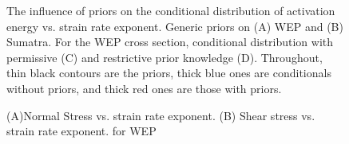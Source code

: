 \documentclass[12pt]{article}
\begin{document}
{\begin{figure}[H]
\caption{The influence of priors on the conditional distribution of activation energy vs. strain rate exponent. Generic priors on (A) WEP 
 and (B) Sumatra. 
For the WEP cross section, conditional distribution with permissive (C) and 
restrictive prior knowledge (D).  
Throughout, thin black contours are the priors, thick blue ones
are conditionals without priors, and thick red ones are those with priors.}
\label{fig:activ_distrib}
\end{figure}




\begin{figure}[H]
\centering
\hspace{-0.85cm}
\hspace{-0.1cm}

\caption{(A)Normal Stress vs. strain rate exponent. 
(B) Shear stress vs. strain rate exponent. 
 for WEP}
\label{fig:stress_distrib1}
\end{figure}


}
\end{document}
